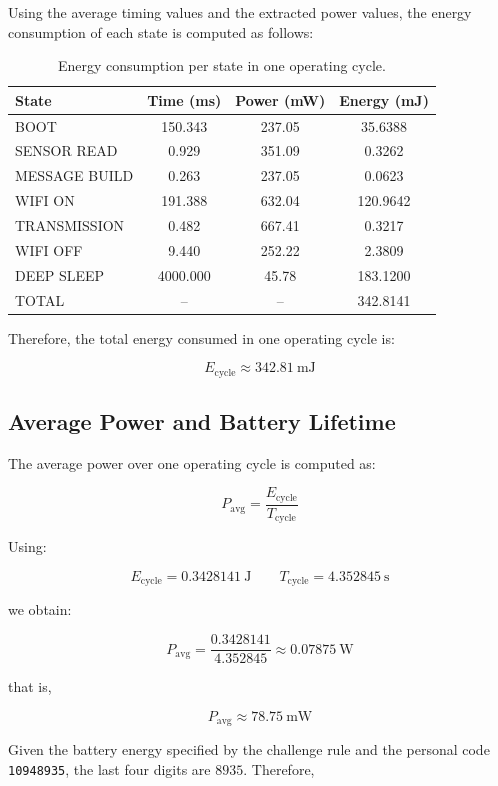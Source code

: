 \documentclass{article}
\begin{document}
Using the average timing values and the extracted power values, the energy consumption of each state is computed as follows:

\begin{table}[H]
\centering
\begin{tabular}{l c c c}
\hline
State & Time (ms) & Power (mW) & Energy (mJ) \\
\hline
BOOT & 150.343 & 237.05 & 35.6388 \\
SENSOR READ & 0.929 & 351.09 & 0.3262 \\
MESSAGE BUILD & 0.263 & 237.05 & 0.0623 \\
WIFI ON & 191.388 & 632.04 & 120.9642 \\
TRANSMISSION & 0.482 & 667.41 & 0.3217 \\
WIFI OFF & 9.440 & 252.22 & 2.3809 \\
DEEP SLEEP & 4000.000 & 45.78 & 183.1200 \\
\hline
TOTAL & -- & -- & 342.8141 \\
\hline
\end{tabular}
\caption{Energy consumption per state in one operating cycle.}
\label{tab:energy_cycle}
\end{table}

Therefore, the total energy consumed in one operating cycle is:

\[
E_{\text{cycle}} \approx 342.81\ \text{mJ}
\]

\subsection{Average Power and Battery Lifetime}

The average power over one operating cycle is computed as:

\[
P_{\text{avg}} = \frac{E_{\text{cycle}}}{T_{\text{cycle}}}
\]

Using:

\[
E_{\text{cycle}} = 0.3428141\ \text{J}
\qquad
T_{\text{cycle}} = 4.352845\ \text{s}
\]

we obtain:

\[
P_{\text{avg}} = \frac{0.3428141}{4.352845} \approx 0.07875\ \text{W}
\]

that is,

\[
P_{\text{avg}} \approx 78.75\ \text{mW}
\]

Given the battery energy specified by the challenge rule and the personal code \texttt{10948935}, the last four digits are \(8935\). Therefore,
\end{document}
